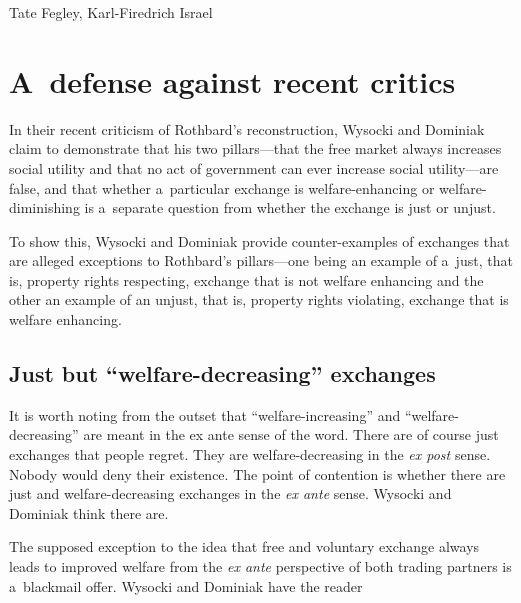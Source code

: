 \begin{artengenv2auth}{Tate Fegley, Karl-Firedrich Israel}
\section{A~defense against recent critics}

In their recent criticism of Rothbard's reconstruction, Wysocki and Dominiak 
\parencite*[][]{wysocki_how_2023} %
 claim to demonstrate that his two pillars---that the free market always increases social utility and that no act of government can ever increase social utility---are false, and that whether a~particular exchange is welfare-enhancing or welfare-diminishing is a~separate question from whether the exchange is just or unjust.



To show this, Wysocki and Dominiak 
\parencite*[][]{wysocki_how_2023} %
 provide counter-examples of exchanges that are alleged exceptions to Rothbard's pillars---one being an example of a~just, that is, property rights respecting, exchange that is not welfare enhancing and the other an example of an unjust, that is, property rights violating, exchange that is welfare enhancing.



\subsection{Just but ``welfare-decreasing'' exchanges}



It is worth noting from the outset that ``welfare-increasing'' and ``welfare-decreasing'' are meant in the ex ante sense of the word. There are of course just exchanges that people regret. They are welfare-decreasing in the \textit{ex post} sense. Nobody would deny their existence. The point of contention is whether there are just and welfare-decreasing exchanges in the \textit{ex ante} sense. Wysocki and Dominiak 
\parencite*[][]{wysocki_how_2023} %
 think there are.



The supposed exception to the idea that free and voluntary exchange always leads to improved welfare from the \textit{ex ante} perspective of both trading partners is a~blackmail offer. Wysocki and Dominiak 
\parencite*[][p.22]{wysocki_how_2023} %
 have the reader




\end{artengenv2auth}
